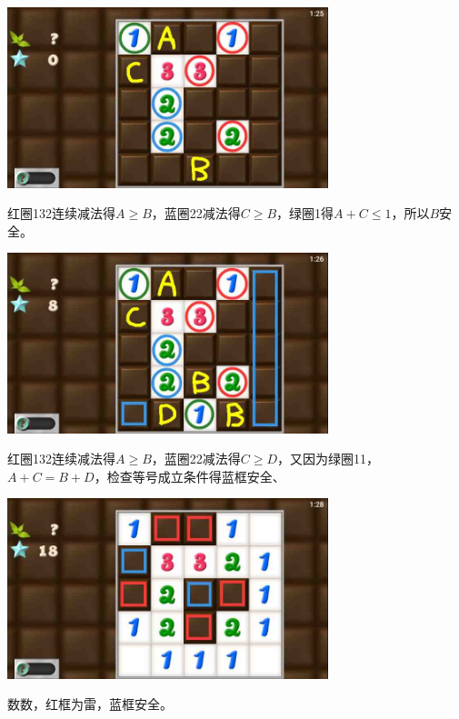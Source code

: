 \subsection{} %
\begin{center}
    \includegraphics[width=0.7\textwidth]{puzzlelow/204-1.jpg}
\end{center}
红圈132连续减法得$A\ge B$，蓝圈22减法得$C\ge B$，绿圈1得$A+C\le 1$，所以$B$安全。
\begin{center}
    \includegraphics[width=0.7\textwidth]{puzzlelow/204-2.jpg}
\end{center}
红圈132连续减法得$A\ge B$，蓝圈22减法得$C\ge D$，又因为绿圈11，$A+C=B+D$，检查等号成立条件得蓝框安全、
\begin{center}
    \includegraphics[width=0.7\textwidth]{puzzlelow/204-3.jpg}
\end{center}
数数，红框为雷，蓝框安全。

